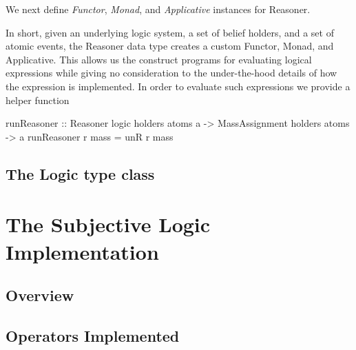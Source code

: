\documentclass[a4paper]{report}
\begin{document}
\par
We next define \emph{Functor}, \emph{Monad}, and \emph{Applicative} instances for
Reasoner.


\par
In short, given an underlying logic system, a set of belief holders, and a set of
atomic events, the Reasoner data type creates a custom Functor, Monad, and Applicative.
This allows us the construct programs for evaluating logical expressions while giving no
consideration to the under-the-hood details of how the expression is implemented. In order
to evaluate such expressions we provide a helper function

\begin{code}
  runReasoner :: Reasoner logic holders atoms a 
              -> MassAssignment holders atoms 
              -> a
  runReasoner r mass = unR r mass
\end{code}





\subsection{The Logic type class}



\section{The Subjective Logic Implementation}

\subsection{Overview}

\subsection{Operators Implemented}
\end{document}
